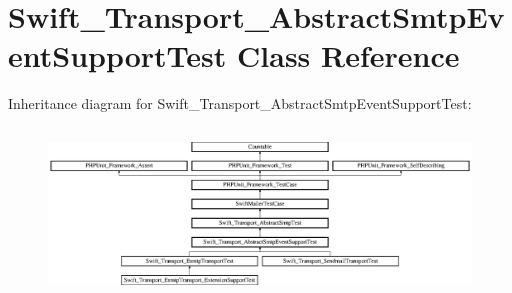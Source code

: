 \section{Swift\+\_\+\+Transport\+\_\+\+Abstract\+Smtp\+Event\+Support\+Test Class Reference}
\label{class_swift___transport___abstract_smtp_event_support_test}
Inheritance diagram for Swift\+\_\+\+Transport\+\_\+\+Abstract\+Smtp\+Event\+Support\+Test\+:\begin{figure}[H]
\begin{center}
\leavevmode
\includegraphics[height=4.525252cm]{class_swift___transport___abstract_smtp_event_support_test}
\end{center}
\end{figure}
